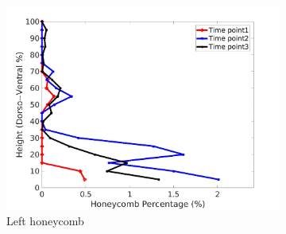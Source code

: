 \begin{figure}[H]
\begin{subfigure}{.42\linewidth}
  \includegraphics[width=\linewidth,trim={{.0\wd0} {.0\wd0} {.0\wd0} {.0\wd0}},clip]{QuantitativeAnalysis/Image/IPF21LeftLungHoneycombDiseaseDorsoToVentral.jpg} %
  \caption{Left honeycomb}
  \label{fig:IPF21DiseaseDorsoToVentralMain-e} 
\end{subfigure} 
\begin{subfigure}{.42\linewidth}%

\end{subfigure}
\end{figure}
